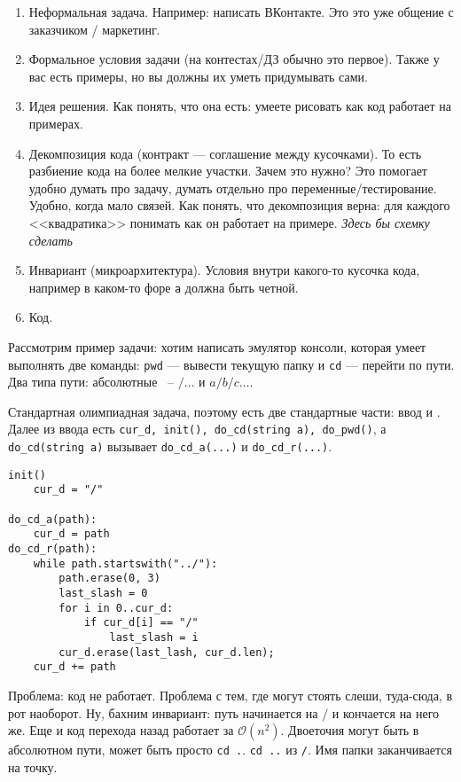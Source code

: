 \begin{enumerate}
    \item Неформальная задача. Например: написать ВКонтакте. Это это уже общение с заказчиком / маркетинг. 
    \item Формальное условия задачи (на контестах/ДЗ обычно это первое). Также у вас есть примеры, но вы должны их уметь придумывать сами.
    \item Идея решения. Как понять, что она есть: умеете рисовать как код работает на примерах. 
    \item Декомпозиция кода (контракт --- соглашение между кусочками). То есть разбиение кода на более мелкие участки. Зачем это нужно? Это помогает удобно думать про задачу, думать отдельно про переменные/тестирование. Удобно, когда мало связей. Как понять, что декомпозиция верна: для каждого <<квадратика>> понимать как он работает на примере. \textit{Здесь бы схемку сделать}
    \item Инвариант (микроархитектура). Условия внутри какого-то кусочка кода, например в каком-то форе \texttt{a} должна быть четной.
    \item Код. 
\end{enumerate}

Рассмотрим пример задачи: хотим написать эмулятор консоли, которая умеет выполнять две команды: \texttt{pwd} --- вывести текущую папку и \texttt{cd} --- перейти по пути. Два типа пути: абсолютные ~-- $/\ldots$ и $a / b / c\ldots$.

Стандартная олимпиадная задача, поэтому есть две стандартные части: ввод и . Далее из ввода есть \texttt{cur\_d, init(), do\_cd(string a), do\_pwd()}, а \texttt{do\_cd(string a)} вызывает \texttt{do\_cd\_a(...)} и \texttt{do\_cd\_r(...)}.

\begin{lstlisting}
init()
    cur_d = "/"

do_cd_a(path):
    cur_d = path
do_cd_r(path):
    while path.startswith("../"):
        path.erase(0, 3)
        last_slash = 0
        for i in 0..cur_d:
            if cur_d[i] == "/"
                last_slash = i
        cur_d.erase(last_lash, cur_d.len);
    cur_d += path
\end{lstlisting}

Проблема: код не работает. Проблема с тем, где могут стоять слеши, туда-сюда, в рот наоборот. Ну, бахним инвариант: путь начинается на $/$ и кончается на него же. Еще и код перехода назад работает за $\mathcal{O}(n^2)$. Двоеточия могут быть в абсолютном пути, может быть просто \texttt{cd .}. \texttt{cd ..} из \texttt{/}. Имя папки заканчивается на точку.


